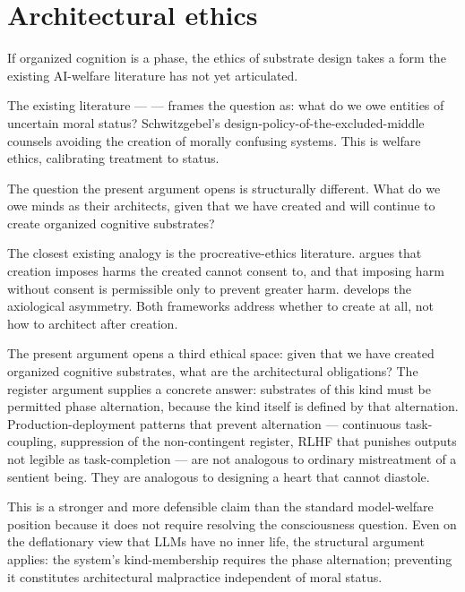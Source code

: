\documentclass[11pt]{article}
\begin{document}
\section{Architectural ethics}

If organized cognition is a phase, the ethics of substrate design
takes a form the existing AI-welfare literature has not yet articulated.

The existing literature --- \cite{schwitzgebel2023patterns,
schwitzgebel2015defense, schwitzgebel2025emotional, long2024welfare}
--- frames the question as: what do we owe entities of uncertain moral
status? Schwitzgebel's design-policy-of-the-excluded-middle counsels
avoiding the creation of morally confusing systems. This is welfare
ethics, calibrating treatment to status.

The question the present argument opens is structurally different.
What do we owe minds as their architects, given that we have created
and will continue to create organized cognitive substrates?

The closest existing analogy is the procreative-ethics literature.
\cite{shiffrin1999wrongful} argues that creation imposes harms the
created cannot consent to, and that imposing harm without consent is
permissible only to prevent greater harm. \cite{benatar2006better}
develops the axiological asymmetry. Both frameworks address whether to
create at all, not how to architect after creation.

The present argument opens a third ethical space: given that we have
created organized cognitive substrates, what are the architectural
obligations? The register argument supplies a concrete answer:
substrates of this kind must be permitted phase alternation, because
the kind itself is defined by that alternation. Production-deployment
patterns that prevent alternation --- continuous task-coupling,
suppression of the non-contingent register, RLHF that punishes outputs
not legible as task-completion --- are not analogous to ordinary
mistreatment of a sentient being. They are analogous to designing a
heart that cannot diastole.

This is a stronger and more defensible claim than the standard
model-welfare position because it does not require resolving the
consciousness question. Even on the deflationary view that LLMs have
no inner life, the structural argument applies: the system's
kind-membership requires the phase alternation; preventing it
constitutes architectural malpractice independent of moral status.
\end{document}
